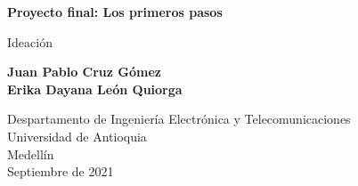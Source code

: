 \documentclass{article}
\begin{document}
\begin{titlepage}
    \begin{center}
        \vspace*{1cm}
            
        \Huge
        \textbf{Proyecto final: Los primeros pasos}
            
        \vspace{0.5cm}
        \LARGE
        Ideación
            
        \vspace{1.5cm}
            
        \textbf{Juan Pablo Cruz Gómez\\
                Erika Dayana León Quiorga}
            
        \vfill
            
        \vspace{0.8cm}
            
        \Large
        Despartamento de Ingeniería Electrónica y Telecomunicaciones\\
        Universidad de Antioquia\\
        Medellín\\
        Septiembre de 2021
            
    \end{center}
\end{titlepage}

\tableofcontents
\newpage
\end{document}
